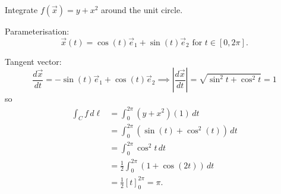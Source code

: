 \documentclass[10pt, a4paper]{article}
\begin{document}
\begin{example}
    Integrate $f(\vec{x}) = y + x ^ 2$ around the unit circle.

    Parameterisation:
    \[
    \vec{x}(t) = \cos(t)\vec{e}_1 + \sin(t)\vec{e}_2 \text{ for } t \in [0, 2\pi].
    \]

    Tangent vector:
    \[
    \frac{d\vec{x}}{dt} = -\sin(t)\vec{e}_1 + \cos(t)\vec{e}_2 \implies \left|\frac{d\vec{x}}{dt}\right| = \sqrt{\sin ^ 2 t + \cos ^ 2 t} = 1
    \]
    so
    \begin{align*}
        \int_{C}f\,d\ell &= \int_{0}^{2\pi}(y + x ^ 2)(1)\,dt \\
        &= \int_{0}^{2\pi}(\sin(t) + \cos ^ 2(t))\,dt \\
        &= \int_{0}^{2\pi}\cos ^ 2t\,dt \\
        &= \frac{1}{2}\int_{0}^{2\pi}(1 + \cos(2t))\,dt \\
        &= \frac{1}{2}\left[t\right]_{0}^{2\pi} = \pi.
    \end{align*}
    \[
    \]
\end{example}
\end{document}
